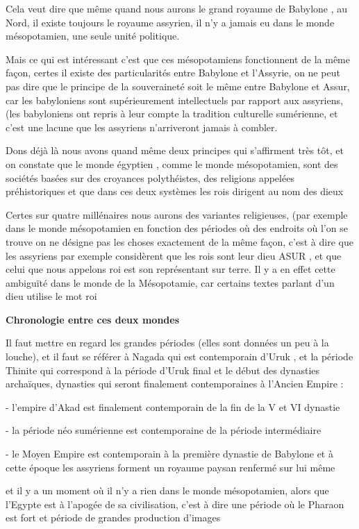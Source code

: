 \documentclass[a4paper,10pt]{article}
\begin{document}
Cela veut dire que même quand nous aurons le grand royaume de Babylone ,
au Nord,  il existe toujours le royaume assyrien, il
n'y a jamais eu dans le monde mésopotamien, une seule
unité politique.

Mais ce qui est intéressant c'est que ces mésopotamiens
fonctionnent de la même façon, certes il existe des particularités
entre Babylone et l'Assyrie, on ne peut pas dire que
le principe de la souveraineté soit le même  entre Babylone et Assur,
car les babyloniens sont supérieurement intellectuels par rapport aux
assyriens, (les babyloniens ont repris à leur compte la tradition
culturelle sumérienne, et c'est une lacune que les
assyriens n'arriveront jamais à combler.

Dons déjà là nous avons quand même deux principes qui
s'affirment très tôt, et on constate que le monde
égyptien , comme le monde mésopotamien, sont des sociétés basées sur
des croyances polythéistes, des religions appelées préhistoriques et
que dans ces deux systèmes  les rois dirigent au nom des dieux

Certes sur quatre millénaires nous aurons des variantes religieuses,
(par exemple dans le monde mésopotamien en fonction des périodes où des
endroits où l'on se trouve on ne désigne pas les
choses exactement de la même façon, c'est à dire que
les assyriens par exemple considèrent que les rois sont leur dieu ASUR
, et que celui que nous appelons roi est son représentant sur terre. 
Il y a en effet cette ambiguïté dans le monde de la Mésopotamie, car
certains textes parlant d'un dieu utilise le mot roi

\textbf{Chronologie entre ces deux mondes }

Il faut mettre en regard les grandes périodes (elles sont données un peu
à la louche), et il faut se référer à Nagada qui est contemporain
d'Uruk , et la période Thinite qui correspond à la
période d'Uruk final et le début des dynasties
archaïques, dynasties qui seront finalement contemporaines à
l'Ancien Empire :

{}-  l'empire d'Akad est finalement
contemporain de la fin de la V et VI dynastie

{}- la période néo sumérienne est contemporaine de la période
intermédiaire

{}- le Moyen Empire est contemporain à la première dynastie de Babylone 
et à cette époque les assyriens forment un royaume paysan renfermé sur
lui même

et il y a un moment où il n'y a rien dans le monde
mésopotamien, alors que l'Egypte est à
l'apogée de sa civilisation, c'est à
dire une période où le Pharaon est fort et période de grandes
production d'images
\end{document}
